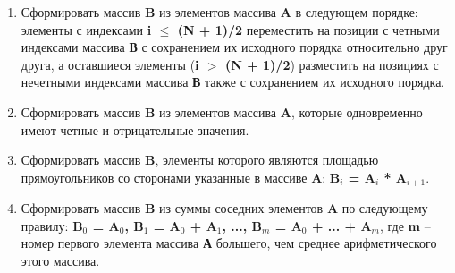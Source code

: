 \begin{enumerate}
    \item Сформировать массив \textbf{B} из элементов массива \textbf{A} в следующем порядке: элементы с индексами \textbf{i $\le$ (N + 1)/2} переместить на позиции с четными индексами массива \textbf{В} с сохранением их исходного порядка относительно друг друга, а оставшиеся элементы (\textbf{i $>$ (N + 1)/2}) разместить на позициях с нечетными индексами массива \textbf{В} также с сохранением их исходного порядка.
    \item Сформировать массив \textbf{B} из элементов массива \textbf{A}, которые одновременно имеют четные и отрицательные значения.
    \item Сформировать массив \textbf{B}, элементы которого являются площадью прямоугольников со сторонами указанные в массиве \textbf{A}: \textbf{B$_i$ = A$_i$ * A$_{i+1}$}.
    \item Сформировать массив \textbf{B} из суммы соседних элементов \textbf{A} по следующему правилу: \textbf{B$_0$ = A$_0$, B$_1$ = A$_0$ + A$_1$, ..., B$_m$ = A$_0$ + ... + A$_m$}, где \textbf{m} – номер
    первого элемента массива \textbf{А} большего, чем среднее арифметического этого массива.
\end{enumerate}
